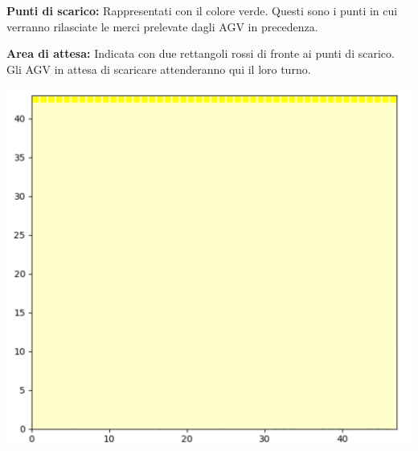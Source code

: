 \documentclass[12pt]{article}
\begin{document}
\begin{minipage}[ht]{0.45\linewidth}
\vspace{0.2cm}
\textbf{Punti di scarico:} Rappresentati con il colore verde. Questi sono i punti in cui verranno rilasciate le merci prelevate dagli AGV in precedenza.
\end{minipage}
\hspace{0.5cm}
\begin{minipage}[]{0.45\linewidth}
\vspace{0.2cm}
\textbf{Area di attesa:} Indicata con due rettangoli rossi di fronte ai punti di scarico. Gli AGV in attesa di scaricare attenderanno qui il loro turno.
\end{minipage}

\begin{minipage}[ht]{0.45\linewidth}
\centering
\includegraphics[width=\textwidth]{Figures/Map/ChargingStation.png}
\end{minipage}
\hspace{0.5cm}
\end{document}
